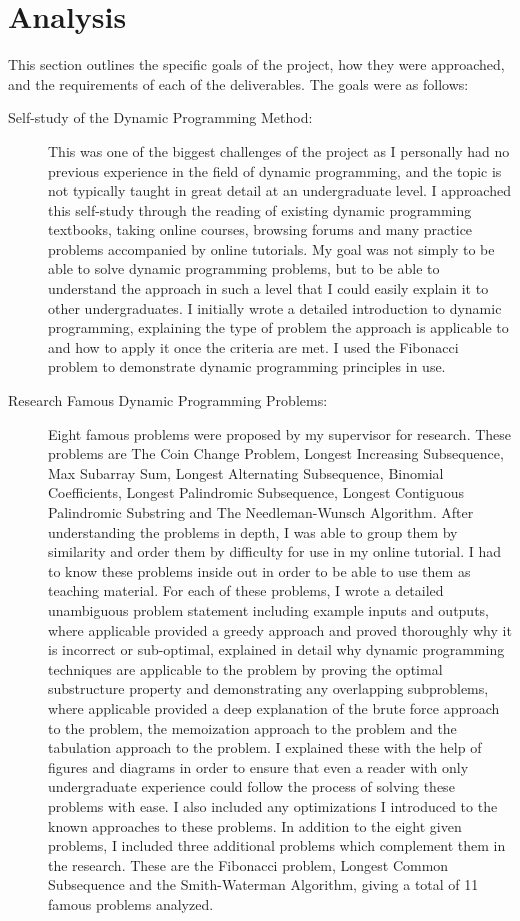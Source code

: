 \chapter{Analysis}
This section outlines the specific goals of the project, how they were approached, and the requirements of each of the deliverables.
The goals were as follows:
\begin{description}
    \item[Self-study of the Dynamic Programming Method:]
    This was one of the biggest challenges of the project as I personally had no previous experience in the field of dynamic programming,
    and the topic is not typically taught in great detail at an undergraduate level.
    I approached this self-study through the reading of existing dynamic programming textbooks, taking online courses, browsing forums and many practice problems accompanied by online tutorials.
    My goal was not simply to be able to solve dynamic programming problems, but to be able to understand the approach in such a level that I could easily explain it to other undergraduates.
    I initially wrote a detailed introduction to dynamic programming, explaining the type of problem the approach is applicable to and how to apply it once the criteria are met.
    I used the Fibonacci problem to demonstrate dynamic programming principles in use.
        
    \item[Research Famous Dynamic Programming Problems:]
    Eight famous problems were proposed by my supervisor for research.
    These problems are The Coin Change Problem, Longest Increasing Subsequence, Max Subarray Sum,
    Longest Alternating Subsequence, Binomial Coefficients, Longest Palindromic Subsequence, Longest Contiguous Palindromic Substring and The Needleman-Wunsch Algorithm.
    After understanding the problems in depth, I was able to group them by similarity and order them by difficulty for use in my online tutorial.
    I had to know these problems inside out in order to be able to use them as teaching material.
    For each of these problems, I wrote a detailed unambiguous problem statement including example inputs and outputs,
    where applicable provided a greedy approach and proved thoroughly why it is incorrect or sub-optimal,
    explained in detail why dynamic programming techniques are applicable to the problem by proving the optimal substructure property and demonstrating any overlapping subproblems,
    where applicable provided a deep explanation of the brute force approach to the problem,
    the memoization approach to the problem and the tabulation approach to the problem.
    I explained these with the help of figures and diagrams in order to ensure that even a reader with only undergraduate experience could follow the process of solving these problems with ease.
    I also included any optimizations I introduced to the known approaches to these problems.
    In addition to the eight given problems, I included three additional problems which complement them in the research. These are the Fibonacci problem, Longest Common Subsequence and the Smith-Waterman Algorithm, giving a total of 11 famous problems analyzed.
     

\end{description}
